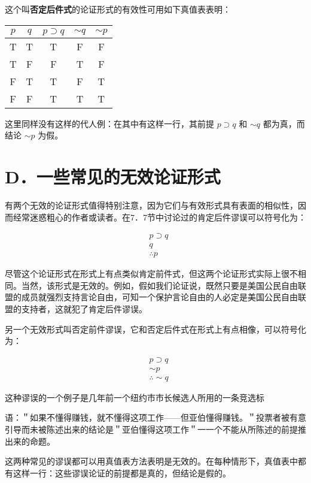 这个叫\textbf{否定后件式}的论证形式的有效性可用如下真值表表明：

\begin{center}
\begin{tabular}{|ccccc|}
\hline
$p$ & $q$ & $p \supset q$ & $\sim q$ & $\sim p$ \\
\hline
T & T & T & F & F \\
T & F & F & T & F \\
F & T & T & F & T \\
F & F & T & T & T \\
\hline
\end{tabular}
\end{center}

这里同样没有这样的代人例：在其中有这样一行，其前提 $p \supset q$ 和 $\sim q$ 都为真，而结论 $\sim p$ 为假。

\section*{D．一些常见的无效论证形式}
有两个无效的论证形式值得特别注意，因为它们与有效形式具有表面的相似性，因而经常迷惑粗心的作者或读者。在7．7节中讨论过的肯定后件谬误可以符号化为：

$$
\begin{aligned}
& p \supset q \\
& q \\
& \therefore p
\end{aligned}
$$

尽管这个论证形式在形式上有点类似肯定前件式，但这两个论证形式实际上很不相同。当然，该形式是无效的。例如，假如我们论证说，既然只要是美国公民自由联盟的成员就强烈支持言论自由，可知一个保护言论自由的人必定是美国公民自由联盟的支持者，这就犯了肯定后件谬误。

另一个无效形式叫否定前件谬误，它和否定后件式在形式上有点相像，可以符号化为：

$$
\begin{aligned}
& p \supset q \\
& \sim p \\
& \therefore \sim q
\end{aligned}
$$

这种谬误的一个例子是几年前一个纽约市市长候选人所用的一条竞选标

语：＂如果不懂得赚钱，就不懂得这项工作——但亚伯懂得赚钱。＂投票者被有意引导而未被陈述出来的结论是＂亚伯懂得这项工作＂一一个不能从所陈述的前提推出来的命题。

这两种常见的谬误都可以用真值表方法表明是无效的。在每种情形下，真值表中都有这样一行：这些谬误论证的前提都是真的，但结论是假的。

